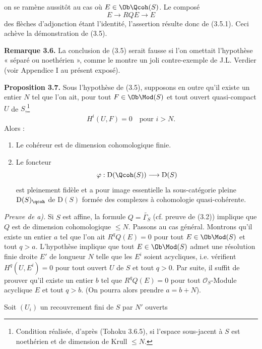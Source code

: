on se
ramène aussitôt au cas où $E\in\Ob\Qcoh(S)$. Le composé
\[
 E\longrightarrow RQE\longrightarrow E
\]
des flèches d'adjonction étant l'identité, l'assertion résulte donc de (3.5.1). Ceci achève la démonstration de (3.5).

\textbf{Remarque 3.6.} La conclusion de (3.5) serait fausse si l'on omettait l'hypothèse « séparé ou noethérien », comme le montre un joli contre-exemple de J.L. Verdier (voir Appendice I au présent exposé).

\textbf{Proposition 3.7.} Sous l'hypothèse de (3.5), supposons en outre qu'il existe un entier $N$ tel que l'on ait, pour tout $F\in\Ob\Mod(S)$ et tout ouvert quasi-compact $U$ de $S$,\footnote{Condition réalisée, d'après (Tohoku 3.6.5), si l'espace sous-jacent à $S$ est noethérien et de dimension de Krull $\leq N$.}
\[
 H^i(U,F)=0\quad\text{pour }i>N.
\]
Alors :
\begin{enumerate}[label=\alph*)]
\item Le cohéreur est de dimension cohomologique finie.
\item Le foncteur
\[
 \varphi:\mathrm D(\Qcoh(S))\longrightarrow \mathrm D(S)
\]
est pleinement fidèle et a pour image essentielle la sous-catégorie pleine $\mathrm D(S)_{\qcoh}$ de $\mathrm D(S)$ formée des complexes à cohomologie quasi-cohérente.
\end{enumerate}

\emph{Preuve de a).} Si $S$ est affine, la formule $Q=\widetilde{\Gamma_S}$ (cf. preuve de (3.2)) implique que $Q$ est de dimension cohomologique $\leq N$. Passons au cas général. Montrons qu'il existe un entier $a$ tel que l'on ait $R^qQ(E)=0$ pour tout $E\in\Ob\Mod(S)$ et tout $q>a$. L'hypothèse implique que tout $E\in\Ob\Mod(S)$ admet une résolution finie droite $E'$ de longueur $N$ telle que les $E^i$ soient acycliques, i.e. vérifient $H^q(U,E^i)=0$ pour tout ouvert $U$ de $S$ et tout $q>0$. Par suite, il suffit de prouver qu'il existe un entier $b$ tel que $R^qQ(E)=0$ pour tout $\mathcal O_S$-Module acyclique $E$ et tout $q>b$. (On pourra alors prendre $a=b+N$).

Soit $(U_i)$ un recouvrement fini de $S$ par $N'$ ouverts
